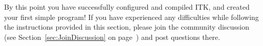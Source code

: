 

By this point you have successfully configured and compiled ITK, and created
your first simple program! If you have experienced any difficulties while
following the instructions provided in this section, please join the community
discussion (see Section~\ref{sec:JoinDiscussion} on
page~\pageref{sec:JoinDiscussion}) and post questions there.
